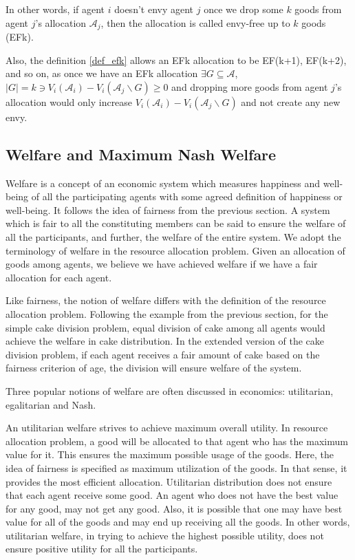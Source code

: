 In other words, if agent $i$ doesn't envy agent $j$ once we drop some $k$ goods from agent $j$'s allocation $\mathcal{A}_j$, then the allocation is called envy-free up to $k$ goods (EFk).

Also, the definition \ref{def_efk} allows an EFk allocation to be EF(k+1), EF(k+2), and so on, as once we have an EFk allocation $ \exists G \subseteq \mathcal{A}$, $ |G|=k \ni V_i(\mathcal{A}_i) - V_i(\mathcal{A}_j \backslash G) \geq 0 $ and dropping more goods from agent $j$'s allocation would only increase $V_i(\mathcal{A}_i) - V_i(\mathcal{A}_j \backslash G)$ and not create any new envy.


\subsection{Welfare and Maximum Nash Welfare}
\label{section_welfare}
Welfare is a concept of an economic system which measures happiness and well-being of all the participating agents with some agreed definition of happiness or well-being. It follows the idea of fairness from the previous section. A system which is fair to all the constituting members can be said to ensure the welfare of all the participants, and further, the welfare of the entire system. We adopt the terminology of welfare in the resource allocation problem. Given an allocation of goods among agents, we believe we have achieved welfare if we have a fair allocation for each agent.

Like fairness, the notion of welfare differs with the definition of the resource allocation problem. Following the example from the previous section, for the simple cake division problem, equal division of cake among all agents would achieve the welfare in cake distribution. In the extended version of the cake division problem, if each agent receives a fair amount of cake based on the fairness criterion of age, the division will ensure welfare of the system.

Three popular notions of welfare are often discussed in economics: utilitarian, egalitarian and Nash.

An utilitarian welfare strives to achieve maximum overall utility. In resource allocation problem, a good will be allocated to that agent who has the maximum value for it. This ensures the maximum possible usage of the goods. Here, the idea of fairness is specified as maximum utilization of the goods. In that sense, it provides the most efficient allocation. Utilitarian distribution does not ensure that each agent receive some good. An agent who does not have the best value for any good, may not get any good. Also, it is possible that one may have best value for all of the goods and may end up receiving all the goods. In other words, utilitarian welfare, in trying to achieve the highest possible utility, does not ensure positive utility for all the participants.

